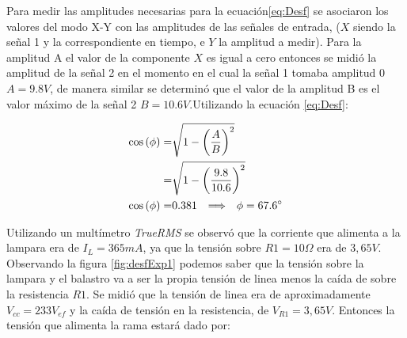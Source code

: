 Para medir las amplitudes necesarias para la ecuación\ref{eq:Desf} se asociaron los valores del modo X-Y con las amplitudes de las señales de entrada, ($X$ siendo la señal 1 y la correspondiente en tiempo, e $Y$ la amplitud a medir). Para la amplitud A el valor de la componente $X$ es igual a cero entonces se midió la amplitud de la señal 2 en el momento en el cual la señal 1 tomaba amplitud 0 $A=9.8V$, de manera similar se determinó que el valor de la amplitud B es el valor máximo de la señal 2 $B=10.6V$.Utilizando la ecuación \ref{eq:Desf}:

\begin{equation*}
\begin{aligned}
     \cos{(\phi)}=&\sqrt{1-{\left(\frac{A}{B}\right)}^2}\\
                =&\sqrt{1-{\left(\frac{9.8}{10.6}\right)}^2}
                \\
                \cos{(\phi)}=&0.381\hspace{0.25cm} \Longrightarrow \hspace{0.25cm}\phi=67.6^\circ
\end{aligned}
\end{equation*}

Utilizando un multímetro \textit{TrueRMS} se observó que la corriente que alimenta a la lampara era de $I_{L}=365mA$, ya que la tensión sobre $R1=10\Omega$ era de $3,65V$. Observando la figura \ref{fig:desfExp1} podemos saber que la tensión sobre la lampara y el balastro va a ser la propia tensión de linea menos la caída de  sobre  la resistencia $R1$. Se midió que la tensión de linea era de aproximadamente $V_{cc}=233 V_{ef}$ y la caída de tensión en la resistencia, de $V_{R1}=3,65V$. Entonces la tensión que alimenta la rama estará dado por:

